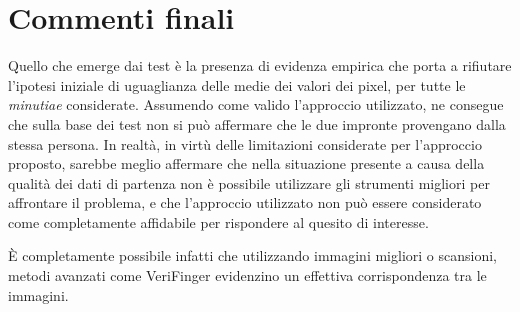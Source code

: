 \documentclass[12pt]{article}
\begin{document}
\section*{Commenti finali}
\noindent
Quello che emerge dai test è la presenza di evidenza empirica che porta a rifiutare l'ipotesi iniziale di uguaglianza delle medie dei valori dei pixel, per tutte le \emph{minutiae} considerate. Assumendo come valido l'approccio utilizzato, ne consegue che sulla base dei test non si può affermare che le due impronte provengano dalla stessa persona. In realtà, in virtù delle limitazioni considerate per l'approccio proposto, sarebbe meglio affermare che nella situazione presente a causa della qualità dei dati di partenza non è possibile utilizzare gli strumenti migliori per affrontare il problema, e che l'approccio utilizzato non può essere considerato come completamente affidabile per rispondere al quesito di interesse.

\`E completamente possibile infatti che utilizzando immagini migliori o scansioni, metodi avanzati come VeriFinger evidenzino un effettiva corrispondenza tra le immagini.
\end{document}
